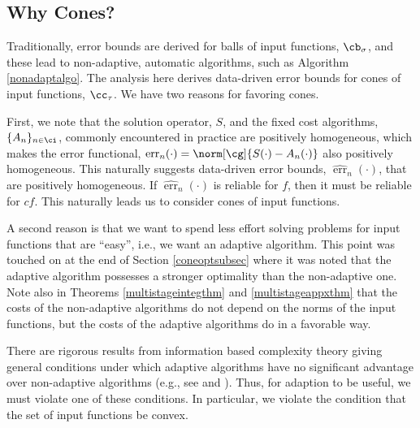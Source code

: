 \documentclass[]{elsarticle}
\DeclareMathOperator{\err}{err}
\newcommand{\herr}{\widehat{\err}}
\theoremstyle{definition}
\theoremstyle{remark}
\newcommand{\Gnorm}[1]{\norm[\cg]{#1}}
\begin{document}
\subsection{Why Cones?}

Traditionally, error bounds are derived for balls of input functions, $\cb_{\sigma}$, and these lead to non-adaptive, automatic algorithms, such as Algorithm \ref{nonadaptalgo}. The analysis here derives data-driven error bounds for cones of input functions, $\cc_{\tau}$.  We have two reasons for favoring cones.  

First, we note that the solution operator, $S$, and the fixed cost algorithms, $\{A_n\}_{n\in \ci}$, commonly encountered in practice are positively homogeneous, which makes the error functional, $\err_n(\cdot) = \Gnorm{S(\cdot)-A_n(\cdot)}$ also positively homogeneous.  This naturally suggests data-driven error bounds, $\herr_n(\cdot)$, that are positively homogeneous.  If $\herr_n(\cdot)$ is reliable for $f$, then it must be reliable for $cf$. This naturally leads us to consider cones of input functions.

A second reason is that we want to spend less effort solving problems for input functions that are ``easy'', i.e., we want an adaptive algorithm.  This point was touched on at the end of Section \ref{coneoptsubsec} where it was noted that the adaptive algorithm possesses a stronger optimality than the non-adaptive one.  Note also in Theorems \ref{multistageintegthm} and \ref{multistageappxthm} that the costs of the non-adaptive algorithms do not depend on the norms of the input functions, but the costs of the adaptive algorithms do in a favorable way.

There are rigorous results from information based complexity theory giving general conditions under which adaptive algorithms have no significant advantage over non-adaptive algorithms (e.g., see \cite[Chapter 4, Theorem 5.2.1]{TraWasWoz88} and \cite{Nov96a}). Thus, for adaption to be useful, we must violate one of these conditions.  In particular, we violate the condition that the set of input functions be convex.
\end{document}
